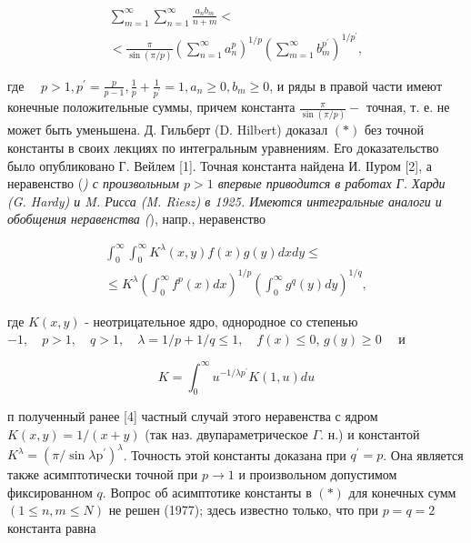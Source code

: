 \documentclass[10pt]{article}
\begin{document}
\[

\begin{gathered}

\sum_{m=1}^{\infty} \sum_{n=1}^{\infty} \frac{a_{n} b_{m}}{n+m}< \\

<\frac{\pi}{\sin (\pi / p)}\left(\sum_{n=1}^{\infty} a_{n}^{p}\right)^{1 / p}\left(\sum_{m=1}^{\infty} b_{m}^{p^{\prime}}\right)^{1 / p^{\prime}},

\end{gathered}

\]



где $\quad p>1, p^{\prime}=\frac{p}{p-1}, \frac{1}{p}+\frac{1}{p^{\prime}}=1, a_{n} \geqslant 0, b_{m} \geqslant 0$, и ряды в правой части имеют конечные положительные суммы, причем константа $\frac{\pi}{\sin (\pi / p)}-$ точная, т. е. не может быть уменьшена. Д. Гильберт (D. Hilbert) доказал $(*)$ без точной константы в своих лекциях по интегральным уравнениям. Его доказательство было опубликовано Г. Вейлем [1]. Точная константа найдена И. ІІуром [2], а неравенство (\textit{) с произвольным $p>1$ впервые приводится в работах Г. Харди (G. Hardy) и M. Рисса (M. Riesz) в 1925. Имеются интегральные аналоги и обобщения неравенства (}), напр., неравенство



\[

\begin{gathered}

\int_{0}^{\infty} \int_{0}^{\infty} K^{\lambda}(x, y) f(x) g(y) d x d y \leqslant \\

\leqslant K^{\lambda}\left(\int_{0}^{\infty} f^{p}(x) d x\right)^{1 / p}\left(\int_{0}^{\infty} g^{q}(y) d y\right)^{1 / q},

\end{gathered}

\]



где $K(x, y)$ - неотрицательное ядро, однородное со степенью $-1, \quad p>1, \quad q>1, \quad \lambda=1 / p+1 / q \leqslant 1, \quad f(x) \leqslant 0$, $g(y) \geqslant 0 \quad$ и



\[

K=\int_{0}^{\infty} u^{-1 / \lambda p^{\prime}} K(1, u) d u

\]



п полученный ранее [4] частный случай этого неравенства с ядром $K(x, y)=1 /(x+y)$ (так наз. двупараметрическое $\Gamma$. н.) и константой $K^{\lambda}=\left(\pi / \sin \lambda \mathrm{p}^{\prime}\right)^{\lambda}$. Точность этой константы доказана при $q^{\prime}=p$. Она является также асимптотически точной при $p \rightarrow 1$ и произвольном допустимом фиксированном $q$. Вопрос об асимптотике константы в $(*)$ для конечных сумм $(1 \leqslant n, m \leqslant N)$ не решен (1977); здесь известно только, что при $p=q=2$ константа равна
\end{document}
